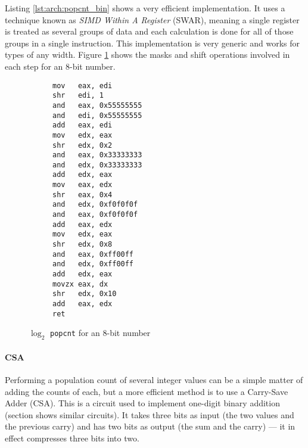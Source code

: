 Listing \ref{lst:arch:popcnt_bin} shows a very efficient implementation.  It
uses a technique known as \textit{SIMD Within A Register} (SWAR), meaning a
single register is treated as several groups of data and each calculation is
done for all of those groups in a single instruction.  This implementation is
very generic and works for types of any width.  Figure \ref{fig:arch:popcnt_bin}
shows the masks and shift operations involved in each step for an 8-bit number.

\begin{figure}[ht]
    \vspace{-\baselineskip}
    \begin{subfigure}[t]{0.7\textwidth}
        
    \end{subfigure}
    \begin{subfigure}[t]{0.275\textwidth}
        \begin{lstlisting}[style=x86]
mov   eax, edi
shr   edi, 1
and   eax, 0x55555555
and   edi, 0x55555555
add   eax, edi
mov   edx, eax
shr   edx, 0x2
and   eax, 0x33333333
and   edx, 0x33333333
add   edx, eax
mov   eax, edx
shr   eax, 0x4
and   edx, 0xf0f0f0f
and   eax, 0xf0f0f0f
add   eax, edx
mov   edx, eax
shr   edx, 0x8
and   eax, 0xff00ff
and   edx, 0xff00ff
add   edx, eax
movzx eax, dx
shr   edx, 0x10
add   eax, edx
ret
        \end{lstlisting}
    \end{subfigure}
    \vspace{-\baselineskip}
\end{figure}

\begin{figure}[p]
    \centering
    
    \caption{$\log_2$ \texttt{popcnt} for an 8-bit number}
    \label{fig:arch:popcnt_bin}
\end{figure}

\paragraph{CSA}

Performing a population count of several integer values can be a simple matter
of adding the counts of each, but a more efficient method is to use a Carry-Save
Adder (CSA).  This is a circuit used to implement one-digit binary addition
(section  shows similar circuits).  It takes three
bits as input (the two values and the previous carry) and has two bits as output
(the sum and the carry) --- it in effect compresses three bits into two.


